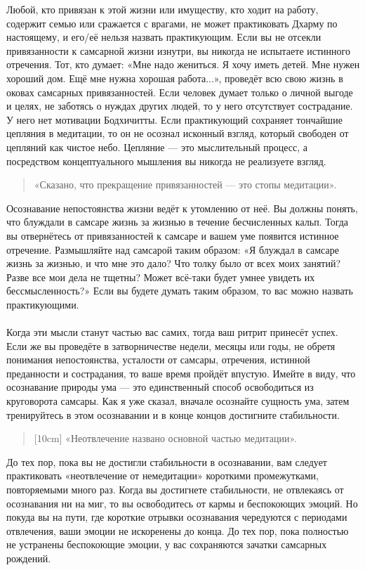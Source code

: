 Любой, кто привязан к этой жизни или имуществу, кто ходит на работу, содержит семью или сражается с врагами, не может практиковать Дхарму по настоящему, и его/её нельзя назвать практикующим. Если вы не отсекли привязанности к самсарной жизни изнутри, вы никогда не испытаете истинного отречения. Тот, кто думает: «Мне надо жениться. Я хочу иметь детей. Мне нужен хороший дом. Ещё мне нужна хорошая работа...», проведёт всю свою жизнь в оковах самсарных привязанностей. Если человек думает только о личной выгоде и целях, не заботясь о нуждах других людей, то у него отсутствует сострадание. У него нет мотивации Бодхичитты. Если практикующий сохраняет тончайшие цепляния в медита\-ции, то он не осознал исконный взгляд, который свободен от цепляний как чистое небо. Цепляние — это мыслительный процесс, а посредством концептуального мышления вы никогда не реализуете взгляд.
\begin{verse}
«Сказано, что прекращение привязанностей — это стопы медитации».
\end{verse}
Осознавание непостоянства жизни ведёт к утомлению от неё. Вы должны понять, что блуждали в самсаре жизнь за жизнью в течение бесчисленных кальп. Тогда вы отвернётесь от привязанностей к самсаре и вашем уме появится истинное отречение. Размышляйте над самсарой таким образом: «Я блуждал в самсаре жизнь за жизнью, и что мне это дало? Что толку было от всех моих занятий? Разве все мои дела не тщетны? Может всё-таки будет умнее увидеть их бессмысленность?» Если вы будете думать таким образом, то вас можно назвать практикующими.
\\ \\ Когда эти мысли станут частью вас самих, тогда ваш ритрит принесёт успех. Если же вы проведёте в затворничестве недели, месяцы или годы, не обретя понимания непостоянства, усталости от самсары, отречения, истинной преданности и сострадания, то ваше время пройдёт впустую. Имейте в виду, что осознавание природы ума — это единственный способ освободиться из круговорота самсары. Как я уже сказал, вначале осознайте сущность ума, затем тренируйтесь в этом осознавании и в конце концов достигните стабильности.
\begin{verse}[10cm]
«Неотвлечение названо основной частью медитации».
\end{verse}
До тех пор, пока вы не достигли стабильности в осознавании, вам следует практиковать «неотвлечение от немедитации» короткими промежутками, повторяемыми много раз. Когда вы достигнете стабильности, не отвлекаясь от осознавания ни на миг, то вы освободитесь от кармы и беспокоющих эмоций. Но покуда вы на пути, где короткие отрывки осознавания чередуются с периодами отвлечения, ваши эмоции не искоренены до конца. До тех пор, пока полностью не устранены беспокоющие эмоции, у вас сохраняются зачатки самсарных рождений.
